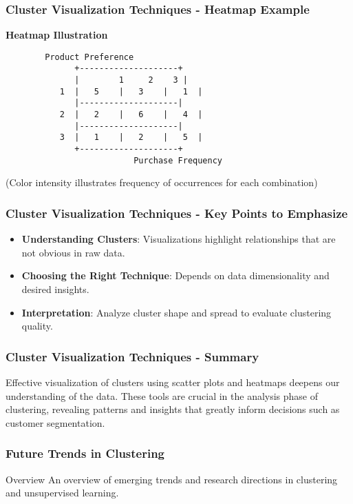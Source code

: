 \documentclass[aspectratio=169]{beamer}
\begin{document}
\begin{frame}[fragile]
    \frametitle{Cluster Visualization Techniques - Heatmap Example}
    \begin{center}
        \textbf{Heatmap Illustration}
        \begin{verbatim}
        Product Preference
              +--------------------+
              |        1     2    3 |
           1  |   5    |   3    |   1  |
              |--------------------|
           2  |   2    |   6    |   4  | 
              |--------------------|
           3  |   1    |   2    |   5  |
              +--------------------+
                          Purchase Frequency
        \end{verbatim}
        (Color intensity illustrates frequency of occurrences for each combination)
    \end{center}
\end{frame}

\begin{frame}[fragile]
    \frametitle{Cluster Visualization Techniques - Key Points to Emphasize}
    \begin{itemize}
        \item \textbf{Understanding Clusters}: Visualizations highlight relationships that are not obvious in raw data.
        \item \textbf{Choosing the Right Technique}: Depends on data dimensionality and desired insights.
        \item \textbf{Interpretation}: Analyze cluster shape and spread to evaluate clustering quality.
    \end{itemize}
\end{frame}

\begin{frame}[fragile]
    \frametitle{Cluster Visualization Techniques - Summary}
    Effective visualization of clusters using scatter plots and heatmaps deepens our understanding of the data. 
    These tools are crucial in the analysis phase of clustering, revealing patterns and insights that greatly inform decisions such as customer segmentation.
\end{frame}

\begin{frame}[fragile]
    \frametitle{Future Trends in Clustering}
    \begin{block}{Overview}
        An overview of emerging trends and research directions in clustering and unsupervised learning.
    \end{block}
\end{frame}
\end{document}

